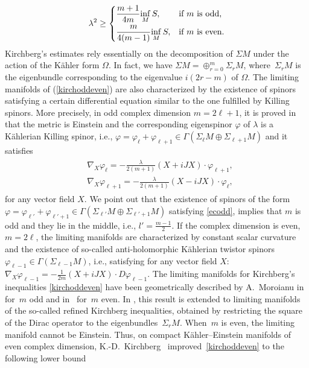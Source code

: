 \documentclass[pdftex]{sigma}
\numberwithin{equation}{section}
\theoremstyle{definition}
\begin{document}
\begin{gather}\label{kirchoddeven}
\lambda^2\geq\begin{cases}
\dfrac{m+1}{4m}\underset{M}{\inf}\,  S,&  \text{if $m$ is odd,} \vspace{1mm}\\
\dfrac{m}{4(m-1)}\underset{M}{\inf} \, S,&   \text{if $m$ is even.}
\end{cases}
\end{gather}
Kirchberg's estimates rely essentially on the decomposition of $\Sigma M$ under the action of the K\"ahler form $\Omega$. In fact, we have $\Sigma M = \oplus_{r=0}^m\Sigma_r M$, where~$\Sigma_r M$ is the eigenbundle corresponding to the eigenvalue $i(2r-m)$ of $\Omega$. The limiting manifolds of (\ref{kirchoddeven}) are also characterized by the existence of
spinors satisfying a certain dif\/ferential equation similar to the one fulf\/illed by Killing spinors.
More precisely, in odd complex dimension $m=2\ell+1$, it is proved in \cite{hij, kirch2,kirch} that the metric is Einstein and the corresponding eigenspinor $\varphi$ of $\lambda$ is a K\"ahlerian Killing spinor,  i.e., $\varphi=\varphi_{\ell}+\varphi_{\ell+1}\in\Gamma(\Sigma_{\ell}  M\oplus \Sigma_{\ell+1}  M)$ and
it satisf\/ies
\begin{gather}
\begin{split}
&\nabla_X \varphi_\ell = -\frac{\lambda}{2(m+1)} (X+iJX)\cdot \varphi_{\ell+1}, \\
&\nabla_X \varphi_{\ell+1} = -\frac{\lambda}{2(m+1)} (X-iJX)\cdot \varphi_{\ell},
\end{split}\label{ecodd}
\end{gather}
for any vector f\/ield $X$.  We point out that the existence of spinors of the form $\varphi=\varphi_{\ell'}+\varphi_{\ell'+1}\in\Gamma(\Sigma_{\ell'}M\oplus\Sigma_{\ell'+1}M)$
satisfying \eqref{ecodd}, implies that $m$ is odd and they lie in the middle,  i.e., $l' =\frac{m-1}{2}$. If the complex dimension is even, $m=2\ell$, the limiting manifolds are characterized by constant scalar curvature and the existence of so-called anti-holomorphic K\"ahlerian twistor spinors $\varphi_{\ell-1}\in\Gamma(\Sigma_{\ell-1}M)$, i.e., satisfying for any vector f\/ield $X$: $\nabla_X \varphi_{\ell-1}= -\frac{1}{2m}(X+iJX)\cdot D\varphi_{\ell-1}$.
The limiting manifolds for Kirchberg's inequalities \eqref{kirchoddeven} have been geometrically described by
A.~Moroianu in~\cite{am_odd} for~$m$ odd and in~\cite{am_even} for~$m$ even. In \cite{pilcapaper}, this result is extended to limiting manifolds of the so-called ref\/ined Kirchberg inequalities, obtained by restricting the square of the Dirac operator to the eigenbundles~$\Sigma_r M$. When~$m$ is even, the limiting manifold cannot be Einstein. Thus,  on compact K\"ahler--Einstein manifolds of even complex dimension, K.-D.~Kirchberg~\cite{kircheven} impro\-ved~\eqref{kirchoddeven}  to the following lower bound
\end{document}
